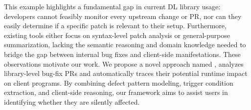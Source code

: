 This example highlights a fundamental gap in current DL library usage:
developers cannot feasibly monitor every upstream change or PR, nor can they easily determine if a specific patch is relevant to their setup. 
Furthermore, existing tools either focus on syntax-level patch analysis or general-purpose summarization, lacking the semantic reasoning and domain knowledge needed to bridge the gap between internal bug fixes and client-side manifestations.
These observations motivate our work. 
We propose a novel approach named \appname, analyzes library-level bug-fix PRs and automatically traces their potential runtime impact on client programs.
By combining defect pattern modeling, trigger condition extraction, and client-side reasoning, our framework aims to assist users in identifying whether they are silently affected.



